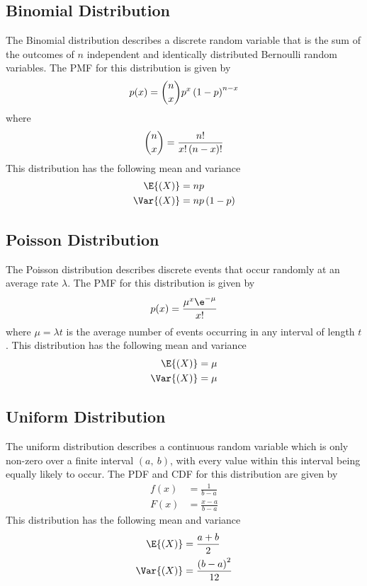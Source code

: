 \documentclass{article}
\begin{document}
\subsection{Binomial Distribution}
The Binomial distribution describes a discrete random variable that is the sum of the outcomes of \(n\)
independent and identically distributed Bernoulli random variables.
The PMF for this distribution is given by
\begin{equation*}
    p(x) = \dbinom{n}{x} p^x \left( 1 - p \right)^{n - x}
\end{equation*}
where
\begin{equation*}
    \dbinom{n}{x} = \frac{n!}{x!\left( n - x \right)!}
\end{equation*}
This distribution has the following mean and variance
\begin{align*}
    \E{\left( X \right)}   & = np                     \\
    \Var{\left( X \right)} & = np\left( 1 - p \right)
\end{align*}
\subsection{Poisson Distribution}
The Poisson distribution describes discrete events that occur randomly at an average rate \(\lambda \).
The PMF for this distribution is given by
\begin{equation*}
    p(x) = \frac{\mu^x\e^{-\mu}}{x!}
\end{equation*}
where \(\mu = \lambda t\) is the average number of events occurring in any interval of length \(t\).
This distribution has the following mean and variance
\begin{align*}
    \E{\left( X \right)}   & = \mu \\
    \Var{\left( X \right)} & = \mu
\end{align*}
\subsection{Uniform Distribution}
The uniform distribution describes a continuous random variable which is only non-zero over a finite interval \(\left( a,\: b \right)\),
with every value within this interval being equally likely to occur. The PDF and CDF for this distribution are given by
\begin{align*}
    f(x) & = \frac{1}{b - a}     \\
    F(x) & = \frac{x - a}{b - a}
\end{align*}
This distribution has the following mean and variance
\begin{align*}
    \E{\left( X \right)}   & = \frac{a + b}{2}                   \\
    \Var{\left( X \right)} & = \frac{\left( b - a \right)^2}{12}
\end{align*}
\end{document}
